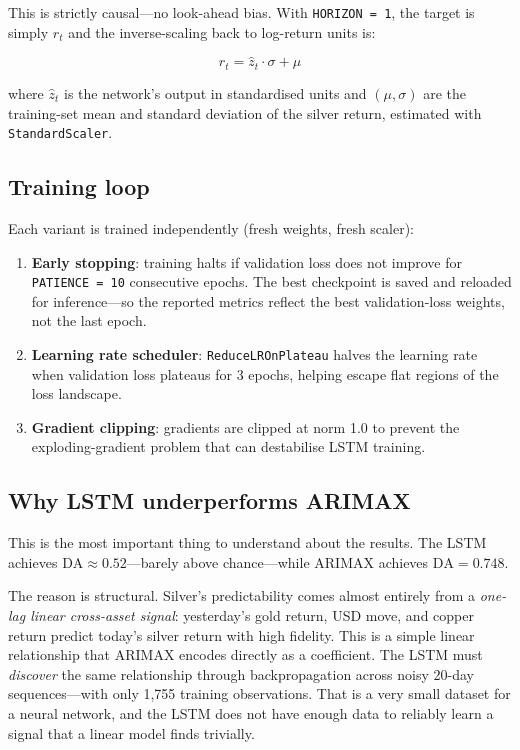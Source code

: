 \documentclass[12pt, a4paper]{article}
\begin{document}
This is strictly causal---no look-ahead bias. With \texttt{HORIZON = 1}, the target
is simply $r_t$ and the inverse-scaling back to log-return units is:

\begin{equation}
  \hat{r}_t = \hat{z}_t \cdot \sigma + \mu
\end{equation}

\noindent where $\hat{z}_t$ is the network's output in standardised units and
$(\mu, \sigma)$ are the training-set mean and standard deviation of the silver return,
estimated with \texttt{StandardScaler}.

\subsection{Training loop}

Each variant is trained independently (fresh weights, fresh scaler):

\begin{enumerate}
  \item \textbf{Early stopping}: training halts if validation loss does not improve
    for \texttt{PATIENCE = 10} consecutive epochs. The best checkpoint is saved and
    reloaded for inference---so the reported metrics reflect the best validation-loss
    weights, not the last epoch.
  \item \textbf{Learning rate scheduler}: \texttt{ReduceLROnPlateau} halves the
    learning rate when validation loss plateaus for 3 epochs, helping escape flat
    regions of the loss landscape.
  \item \textbf{Gradient clipping}: gradients are clipped at norm 1.0 to prevent
    the exploding-gradient problem that can destabilise LSTM training.
\end{enumerate}

\subsection{Why LSTM underperforms ARIMAX}

This is the most important thing to understand about the results. The LSTM achieves
$\text{DA} \approx 0.52$---barely above chance---while ARIMAX achieves $\text{DA} =
0.748$.

The reason is structural. Silver's predictability comes almost entirely from a
\emph{one-lag linear cross-asset signal}: yesterday's gold return, USD move, and
copper return predict today's silver return with high fidelity. This is a simple
linear relationship that ARIMAX encodes directly as a coefficient. The LSTM must
\emph{discover} the same relationship through backpropagation across noisy 20-day
sequences---with only 1,755 training observations. That is a very small dataset for a
neural network, and the LSTM does not have enough data to reliably learn a signal that
a linear model finds trivially.
\end{document}
